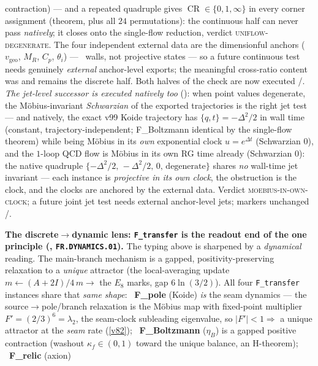 contraction) --- and a repeated quadruple gives $\operatorname{CR}\in\{0,1,\infty\}$ in every
corner assignment (theorem, plus all $24$ permutations): the continuous half can never pass
\emph{natively}; it closes onto the single-flow reduction, verdict \textsc{uniflow-degenerate}.
The four independent external data are the dimensionful anchors ($v_{\mathrm{geo}}$, $M_R$,
$C_p$, $\theta_i$) --- \mO\ walls, not projective states --- so a future continuous test needs
genuinely \emph{external} anchor-level exports; the meaningful cross-ratio content was and
remains the discrete half.  Both halves of the check are now executed \mE/\mC.
\emph{The jet-level successor is executed natively too}
(): when point values degenerate, the M\"obius-invariant
\emph{Schwarzian} of the exported trajectories is the right jet test --- and natively, the
exact v99 Koide trajectory has $\{q,t\}=-\Delta^2/2$ in wall time (constant,
trajectory-independent; F\_Boltzmann identical by the single-flow theorem) while being
M\"obius in its \emph{own} exponential clock $u=e^{\Delta t}$ (Schwarzian $0$), and the
$1$-loop QCD flow is M\"obius in its own RG time already (Schwarzian $0$): the native
quadruple $\{-\Delta^2/2,\,-\Delta^2/2,\,0,\,\text{degenerate}\}$ shares \emph{no}
wall-time jet invariant --- each instance is \emph{projective in its own clock}, the
obstruction is the clock, and the clocks are anchored by the external data.  Verdict
\textsc{moebius-in-own-clock}; a future joint jet test needs external anchor-level jets;
markers unchanged \mE/\mC.
\par\smallskip\noindent\textbf{The discrete$\to$dynamic lens: \texttt{F\_transfer} is the readout end of the one
principle (, \texttt{FR.DYNAMICS.01}).} The typing above is sharpened by a
\emph{dynamical} reading. The main-branch mechanism is a gapped, positivity-preserving relaxation to a
\emph{unique} attractor (the local-averaging update $m\!\leftarrow\!(A{+}2I)/4\,m\to$ the $E_8$ marks, gap
$6\ln(3/2)$). All four \texttt{F\_transfer} instances share that \emph{same shape}: \mE\ \textbf{F\_pole} (Koide)
\emph{is} the seam dynamics --- the source$\to$pole/branch relaxation is the M\"obius map with fixed-point
multiplier $F'{=}(2/3)^6{=}\lambda_2$, the seam-clock subleading eigenvalue, so $|F'|<1\Rightarrow$ a unique
attractor at the \emph{seam} rate (\vref{v82}); \mC\ \textbf{F\_Boltzmann} ($\eta_B$) is a gapped positive
contraction (washout $\kappa_f\in(0,1)$ toward the unique balance, an H-theorem); \mC\ \textbf{F\_relic} (axion)
